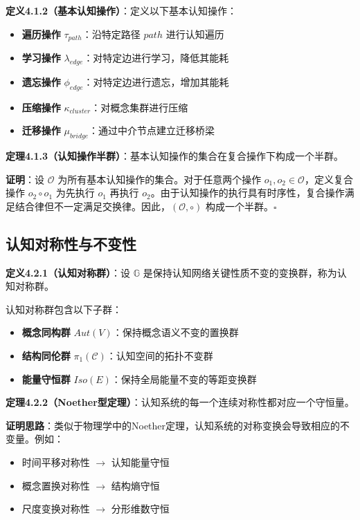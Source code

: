 \documentclass[12pt,a4paper]{article}
\newcommand{\cognitivespace}{\mathcal{C}}
\newcommand{\cognitivegroup}{\mathbb{G}}
\begin{document}
\textbf{定义4.1.2（基本认知操作）}：定义以下基本认知操作：
\begin{itemize}
\item \textbf{遍历操作} $\tau_{path}$：沿特定路径 $path$ 进行认知遍历
\item \textbf{学习操作} $\lambda_{edge}$：对特定边进行学习，降低其能耗
\item \textbf{遗忘操作} $\phi_{edge}$：对特定边进行遗忘，增加其能耗
\item \textbf{压缩操作} $\kappa_{cluster}$：对概念集群进行压缩
\item \textbf{迁移操作} $\mu_{bridge}$：通过中介节点建立迁移桥梁
\end{itemize}

\textbf{定理4.1.3（认知操作半群）}：基本认知操作的集合在复合操作下构成一个半群。

\textbf{证明}：设 $\mathcal{O}$ 为所有基本认知操作的集合。对于任意两个操作 $o_1, o_2 \in \mathcal{O}$，定义复合操作 $o_2 \circ o_1$ 为先执行 $o_1$ 再执行 $o_2$。由于认知操作的执行具有时序性，复合操作满足结合律但不一定满足交换律。因此，$(\mathcal{O}, \circ)$ 构成一个半群。$\square$

\subsection{认知对称性与不变性}

\textbf{定义4.2.1（认知对称群）}：设 $\cognitivegroup$ 是保持认知网络关键性质不变的变换群，称为认知对称群。

认知对称群包含以下子群：
\begin{itemize}
\item \textbf{概念同构群} $Aut(V)$：保持概念语义不变的置换群
\item \textbf{结构同伦群} $\pi_1(\cognitivespace)$：认知空间的拓扑不变群
\item \textbf{能量守恒群} $Iso(E)$：保持全局能量不变的等距变换群
\end{itemize}

\textbf{定理4.2.2（Noether型定理）}：认知系统的每一个连续对称性都对应一个守恒量。

\textbf{证明思路}：类似于物理学中的Noether定理，认知系统的对称变换会导致相应的不变量。例如：
\begin{itemize}
\item 时间平移对称性 $\rightarrow$ 认知能量守恒
\item 概念置换对称性 $\rightarrow$ 结构熵守恒
\item 尺度变换对称性 $\rightarrow$ 分形维数守恒
\end{itemize}
\end{document}
